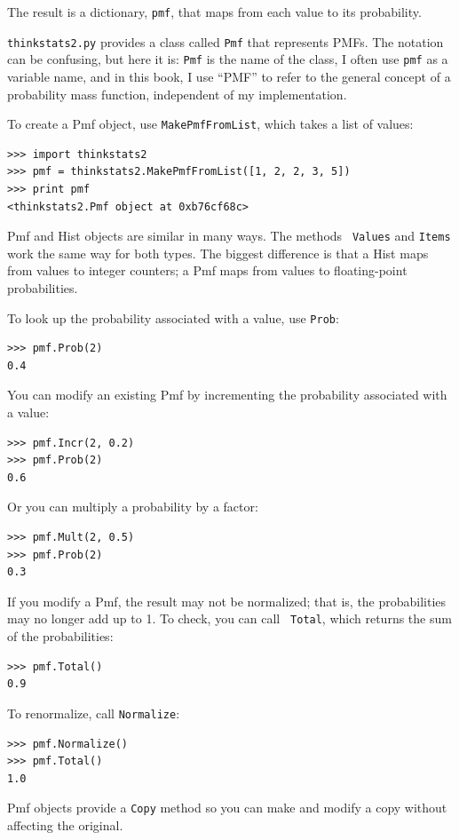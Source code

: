 \documentclass[12pt]{book}
\begin{document}
The result is a dictionary, {\tt pmf}, that maps from each value
to its probability.

{\tt thinkstats2.py} provides a class called {\tt Pmf} that represents PMFs.
The notation can be confusing, but here it is: {\tt Pmf} is the
name of the class, I often use {\tt pmf} as a variable name, and in
this book, I use ``PMF'' to refer to the general concept
of a probability mass function, independent of my implementation.

To create a Pmf object, use {\tt MakePmfFromList}, which takes a list
of values:
%
\begin{verbatim}
>>> import thinkstats2
>>> pmf = thinkstats2.MakePmfFromList([1, 2, 2, 3, 5])
>>> print pmf
<thinkstats2.Pmf object at 0xb76cf68c>
\end{verbatim}

Pmf and Hist objects are similar in many ways.  The methods {\tt
  Values} and {\tt Items} work the same way for both types.  The
biggest difference is that a Hist maps from values to integer
counters; a Pmf maps from values to floating-point probabilities.

To look up the probability associated with a value, use {\tt Prob}:
%
\begin{verbatim}
>>> pmf.Prob(2)
0.4
\end{verbatim}

You can modify an existing Pmf by incrementing the probability
associated with a value:
%
\begin{verbatim}
>>> pmf.Incr(2, 0.2)
>>> pmf.Prob(2)
0.6
\end{verbatim}

Or you can multiply a probability by a factor:
%
\begin{verbatim}
>>> pmf.Mult(2, 0.5)
>>> pmf.Prob(2)
0.3
\end{verbatim}

If you modify a Pmf, the result may not be normalized; that is, the
probabilities may no longer add up to 1.  To check, you can call {\tt
  Total}, which returns the sum of the probabilities:
%
\begin{verbatim}
>>> pmf.Total()
0.9
\end{verbatim}

To renormalize, call {\tt Normalize}:
%
\begin{verbatim}
>>> pmf.Normalize()
>>> pmf.Total()
1.0
\end{verbatim}

Pmf objects provide a {\tt Copy} method so you can make
and modify a copy without affecting the original.
\end{document}
